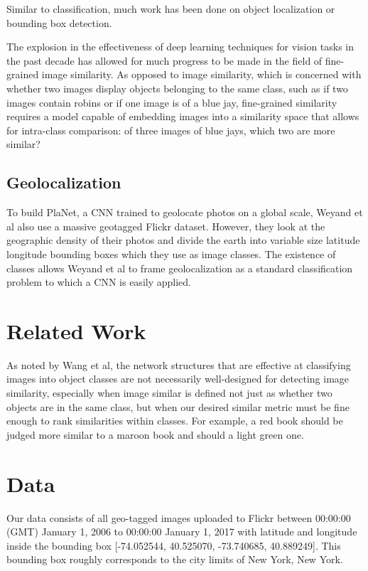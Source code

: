 \documentclass[pageno]{jpaper}
\begin{document}
Similar to classification, much work has been done on object localization or bounding box detection.\cite{zhang2014part}

The explosion in the effectiveness of deep learning techniques for vision tasks in the past decade has allowed for much progress to be made in the field of fine-grained image similarity. As opposed to image similarity, which is concerned with whether two images display objects belonging to the same class, such as if two images contain robins or if one image is of a blue jay, fine-grained similarity requires a model capable of embedding images into a similarity space that allows for intra-class comparison: of three images of blue jays, which two are more similar?\\


\subsection{Geolocalization}
To build PlaNet, a CNN trained to geolocate photos on a global scale, Weyand et al also use a massive geotagged Flickr dataset.\cite{weyand2016planet} However, they look at the geographic density of their photos and divide the earth into variable size latitude longitude bounding boxes which they use as image classes. The existence of classes allows Weyand et al to frame geolocalization as a standard classification problem to which a CNN is easily applied. 


\section{Related Work}
As noted by Wang et al\cite{wang2014learning}, the network structures that are effective at classifying images into object classes are not necessarily well-designed for detecting image similarity, especially when image similar is defined not just as whether two objects are in the same class, but when our desired similar metric must be fine enough to rank similarities within classes. For example, a red book should be judged more similar to a maroon book and should a light green one. 

\section{Data}
Our data consists of all geo-tagged images uploaded to Flickr between 00:00:00 (GMT) January 1, 2006 to 00:00:00 January 1, 2017 with latitude and longitude inside the bounding box [-74.052544, 40.525070, -73.740685, 40.889249]. This bounding box roughly corresponds to the city limits of New York, New York. 
\end{document}
